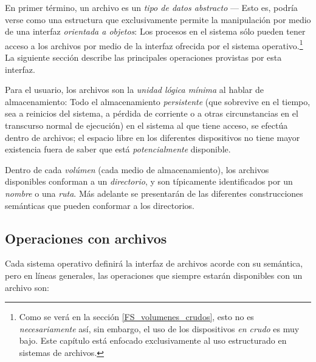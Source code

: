 \documentclass[11pt,fleqn]{book} %
\begin{document}
En primer término, un archivo es un \emph{tipo de datos abstracto} — Esto
es,  podría verse como una estructura que
exclusivamente permite la manipulación por medio de una interfaz
\emph{orientada a objetos}: Los procesos en el sistema sólo pueden tener
acceso a los archivos por medio de la interfaz ofrecida por el sistema
operativo.\footnote{Como se verá en la sección \ref{FS_volumenes_crudos}, esto no es \emph{necesariamente}
así, sin embargo, el uso de los dispositivos \emph{en crudo} es muy
bajo. Este capítulo está enfocado exclusivamente al uso estructurado
en sistemas de archivos. } La siguiente
sección describe las principales operaciones provistas por esta
interfaz.

Para el usuario, los archivos son la \emph{unidad lógica mínima} al hablar
de almacenamiento: Todo el almacenamiento \emph{persistente} (que sobrevive
en el tiempo, sea a reinicios del sistema, a pérdida de corriente o a
otras circunstancias en el transcurso normal de ejecución) en el
sistema al que tiene acceso, se efectúa dentro de archivos; el espacio
libre en los diferentes dispositivos no tiene mayor existencia fuera
de saber que está \emph{potencialmente} disponible.

Dentro de cada \emph{volúmen} (cada medio de almacenamiento), los archivos
disponibles conforman a un \emph{directorio}, y son típicamente
identificados por un \emph{nombre} o una \emph{ruta}. Más adelante se
presentarán de las diferentes construcciones semánticas que pueden
conformar a los directorios.
\subsection{Operaciones con archivos}
\label{sec-6-2-1}
\label{DIR_operaciones_con_archivos}


Cada sistema operativo definirá la interfaz de archivos acorde con su
semántica, pero en líneas generales, las operaciones que siempre
estarán disponibles con un archivo son:
\end{document}
